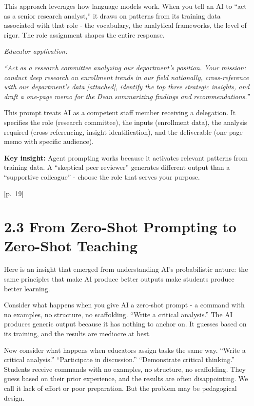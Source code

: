 \documentclass[
  letterpaper,
  DIV=11,
  numbers=noendperiod]{scrreprt}
\begin{document}
This approach leverages how language models work. When you tell an AI to
``act as a senior research analyst,'' it draws on patterns from its
training data associated with that role - the vocabulary, the analytical
frameworks, the level of rigor. The role assignment shapes the entire
response.

\emph{Educator application:}

\emph{``Act as a research committee analyzing our department's position.
Your mission: conduct deep research on enrollment trends in our field
nationally, cross-reference with our department's data {[}attached{]},
identify the top three strategic insights, and draft a one-page memo for
the Dean summarizing findings and recommendations.''}

This prompt treats AI as a competent staff member receiving a
delegation. It specifies the role (research committee), the inputs
(enrollment data), the analysis required (cross-referencing, insight
identification), and the deliverable (one-page memo with specific
audience).

\textbf{Key insight:} Agent prompting works because it activates
relevant patterns from training data. A ``skeptical peer reviewer''
generates different output than a ``supportive colleague'' - choose the
role that serves your purpose.

{[}p.~19{]}

\section{2.3 From Zero-Shot Prompting to Zero-Shot
Teaching}\label{from-zero-shot-prompting-to-zero-shot-teaching}

Here is an insight that emerged from understanding AI's probabilistic
nature: the same principles that make AI produce better outputs make
students produce better learning.

Consider what happens when you give AI a zero-shot prompt - a command
with no examples, no structure, no scaffolding. ``Write a critical
analysis.'' The AI produces generic output because it has nothing to
anchor on. It guesses based on its training, and the results are
mediocre at best.

Now consider what happens when educators assign tasks the same way.
``Write a critical analysis.'' ``Participate in discussion.''
``Demonstrate critical thinking.'' Students receive commands with no
examples, no structure, no scaffolding. They guess based on their prior
experience, and the results are often disappointing. We call it lack of
effort or poor preparation. But the problem may be pedagogical design.
\end{document}
